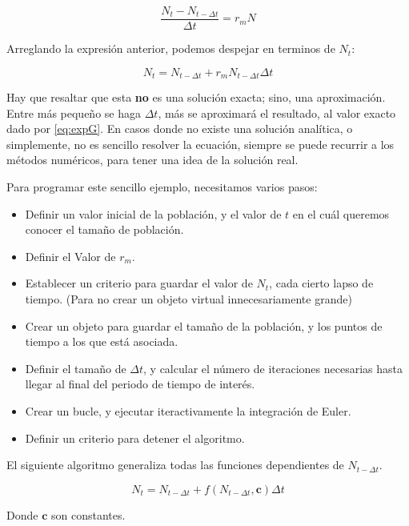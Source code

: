\documentclass[12pt,letterpaper,]{book}
\begin{document}
\[
\frac{N_t - N_{t-\Delta t}}{\Delta t} = r_m N
\]

Arreglando la expresión anterior, podemos despejar en terminos de
\(N_t\):

\[
N_t= N_{t-\Delta t} + r_m N_{t-\Delta t} \Delta t
\]

Hay que resaltar que esta \textbf{no} es una solución exacta; sino, una
aproximación. Entre más pequeño se haga \(\Delta t\), más se aproximará
el resultado, al valor exacto dado por \eqref{eq:expG}. En casos donde no
existe una solución analítica, o simplemente, no es sencillo resolver la
ecuación, siempre se puede recurrir a los métodos numéricos, para tener
una idea de la solución real.

Para programar este sencillo ejemplo, necesitamos varios pasos:

\begin{itemize}
\item
  Definir un valor inicial de la población, y el valor de \(t\) en el
  cuál queremos conocer el tamaño de población.
\item
  Definir el Valor de \(r_m\).
\item
  Establecer un criterio para guardar el valor de \(N_t\), cada cierto
  lapso de tiempo. (Para no crear un objeto virtual innecesariamente
  grande)
\item
  Crear un objeto para guardar el tamaño de la población, y los puntos
  de tiempo a los que está asociada.
\item
  Definir el tamaño de \(\Delta t\), y calcular el número de iteraciones
  necesarias hasta llegar al final del periodo de tiempo de interés.
\item
  Crear un bucle, y ejecutar iteractivamente la integración de Euler.
\item
  Definir un criterio para detener el algoritmo.
\end{itemize}

El siguiente algoritmo generaliza todas las funciones dependientes de
\(N_{t-\Delta t}\).

\[
N_t= N_{t-\Delta t} + f \left( N_{t-\Delta t},\mathbf{c} \right) \Delta t
\]

Donde \(\mathbf{c}\) son constantes.
\end{document}
